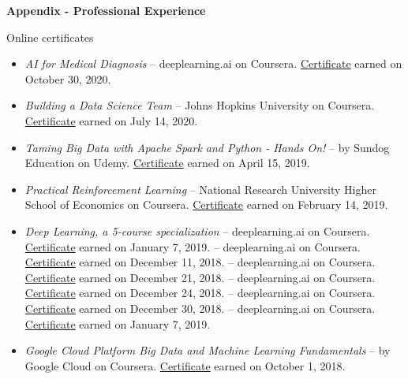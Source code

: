\hfil{\Large{\bf Appendix - Professional Experience}}\hfil\\
\nameskip\break

\begin{rSection}{Online certificates}
  \begin{itemize}
    \item{\it AI for Medical Diagnosis} -- deeplearning.ai on Coursera.
    \href{https://coursera.org/share/aea6e47d93de58241709766351f714aa}{Certificate} earned on October 30, 2020.
    \item{\it Building a Data Science Team} -- Johns Hopkins University on Coursera.
    \href{https://coursera.org/share/9d296dc31002fa58759569a1e2ebcddc}{Certificate} earned on July 14, 2020.
    \item{\it Taming Big Data with Apache Spark and Python - Hands On!} -- by Sundog Education on Udemy. \href{https://www.udemy.com/certificate/UC-G53DWS5V/}{Certificate} earned on April 15, 2019.
    \item {\it Practical Reinforcement Learning} -- National Research University Higher School of Economics on Coursera. \href{https://coursera.org/share/7dbaef1de4f13d7016316a4dd7eece8a}{Certificate} earned on February 14, 2019.
    \item{\it Deep Learning, a 5-course specialization} -- deeplearning.ai on Coursera. \href{https://coursera.org/share/47b1d9ff10e34c9d26c75f5f0914379b}{Certificate} earned on January 7, 2019.
     -- deeplearning.ai on Coursera. \href{https://coursera.org/share/b99cfdbf684af876690916f62a41f74d}{Certificate} earned on December 11, 2018.
     -- deeplearning.ai on Coursera. \href{https://coursera.org/share/70436cea6ad8695c56da96f285739488}{Certificate} earned on December 21, 2018.
     -- deeplearning.ai on Coursera. \href{https://coursera.org/share/b4fec0b5c8ada28277e0369aced10c34}{Certificate} earned on December 24, 2018.
     -- deeplearning.ai on Coursera. \href{https://coursera.org/share/efaf45dddda63778f97da9aafaaa71b0}{Certificate} earned on December 30, 2018.
     -- deeplearning.ai on Coursera. \href{https://coursera.org/share/aeb503aafcd63fd9b1e098c232c6cfa4}{Certificate} earned on January 7, 2019.
    \item {\it Google Cloud Platform Big Data and Machine Learning Fundamentals} -- by Google Cloud on Coursera. \href{https://coursera.org/share/469ce1832e0392458bc6930beb44d8c6}{Certificate} earned on October 1, 2018.
  \end{itemize}
\end{rSection}


